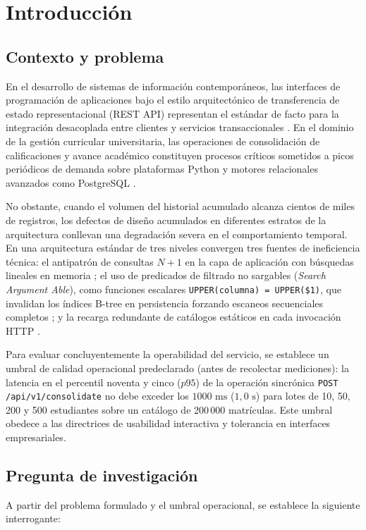 \documentclass[conference]{IEEEtran}
\begin{document}
\section{Introducción}

\subsection{Contexto y problema}
En el desarrollo de sistemas de información contemporáneos, las interfaces de programación de aplicaciones bajo el estilo arquitectónico de transferencia de estado representacional (REST API) representan el estándar de facto para la integración desacoplada entre clientes y servicios transaccionales \cite{diMeglio2024}. En el dominio de la gestión curricular universitaria, las operaciones de consolidación de calificaciones y avance académico constituyen procesos críticos sometidos a picos periódicos de demanda sobre plataformas Python y motores relacionales avanzados como PostgreSQL \cite{Bednarz2025,Taipalus2024}.

No obstante, cuando el volumen del historial acumulado alcanza cientos de miles de registros, los defectos de diseño acumulados en diferentes estratos de la arquitectura conllevan una degradación severa en el comportamiento temporal. En una arquitectura estándar de tres niveles convergen tres fuentes de ineficiencia técnica: el antipatrón de consultas $N+1$ en la capa de aplicación con búsquedas lineales en memoria \cite{Yang2019}; el uso de predicados de filtrado no sargables (\textit{Search Argument Able}), como funciones escalares \texttt{UPPER(columna) = UPPER(\$1)}, que invalidan los índices B-tree en persistencia forzando escaneos secuenciales completos \cite{Liu2023}; y la recarga redundante de catálogos estáticos en cada invocación HTTP \cite{Mertz2021}.

Para evaluar concluyentemente la operabilidad del servicio, se establece un umbral de calidad operacional predeclarado (antes de recolectar mediciones): la latencia en el percentil noventa y cinco ($p95$) de la operación sincrónica \texttt{POST /api/v1/consolidate} no debe exceder los $1000\text{ ms}$ ($1,0\text{ s}$) para lotes de 10, 50, 200 y 500 estudiantes sobre un catálogo de 200\,000 matrículas. Este umbral obedece a las directrices de usabilidad interactiva y tolerancia en interfaces empresariales.

\subsection{Pregunta de investigación}
A partir del problema formulado y el umbral operacional, se establece la siguiente interrogante:
\end{document}
